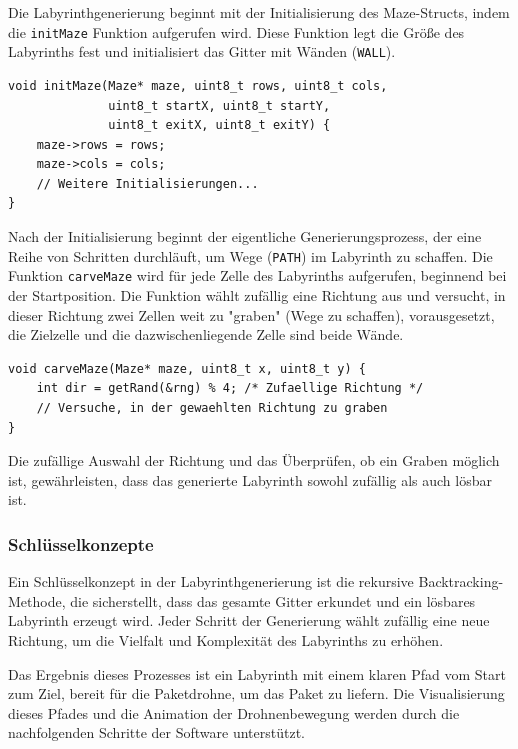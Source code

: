 Die Labyrinthgenerierung beginnt mit der Initialisierung des Maze-Structs, indem die \texttt{initMaze} Funktion aufgerufen wird. Diese Funktion legt die Größe des Labyrinths fest und initialisiert das Gitter mit Wänden (\texttt{WALL}).

\begin{lstlisting}[style=CStyle]
void initMaze(Maze* maze, uint8_t rows, uint8_t cols, 
              uint8_t startX, uint8_t startY, 
              uint8_t exitX, uint8_t exitY) {
    maze->rows = rows;
    maze->cols = cols;
    // Weitere Initialisierungen...
}
\end{lstlisting}

Nach der Initialisierung beginnt der eigentliche Generierungsprozess, der eine Reihe von Schritten durchläuft, um Wege (\texttt{PATH}) im Labyrinth zu schaffen. Die Funktion \texttt{carveMaze} wird für jede Zelle des Labyrinths aufgerufen, beginnend bei der Startposition. Die Funktion wählt zufällig eine Richtung aus und versucht, in dieser Richtung zwei Zellen weit zu "graben" (Wege zu schaffen), vorausgesetzt, die Zielzelle und die dazwischenliegende Zelle sind beide Wände.

\begin{lstlisting}[style=CStyle]
void carveMaze(Maze* maze, uint8_t x, uint8_t y) {
    int dir = getRand(&rng) % 4; /* Zufaellige Richtung */
    // Versuche, in der gewaehlten Richtung zu graben
}
\end{lstlisting}

Die zufällige Auswahl der Richtung und das Überprüfen, ob ein Graben möglich ist, gewährleisten, dass das generierte Labyrinth sowohl zufällig als auch lösbar ist.

\subsubsection{Schlüsselkonzepte}

Ein Schlüsselkonzept in der Labyrinthgenerierung ist die rekursive Backtracking-Methode, die sicherstellt, dass das gesamte Gitter erkundet und ein lösbares Labyrinth erzeugt wird. Jeder Schritt der Generierung wählt zufällig eine neue Richtung, um die Vielfalt und Komplexität des Labyrinths zu erhöhen.

Das Ergebnis dieses Prozesses ist ein Labyrinth mit einem klaren Pfad vom Start zum Ziel, bereit für die Paketdrohne, um das Paket zu liefern. Die Visualisierung dieses Pfades und die Animation der Drohnenbewegung werden durch die nachfolgenden Schritte der Software unterstützt.

